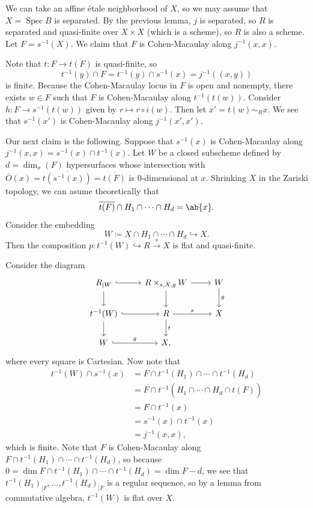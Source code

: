 \documentclass{amsart}
\theoremstyle{definition}
\theoremstyle{remark}
\theoremstyle{plain}
\theoremstyle{definition}
\theoremstyle{remark}
\newcommand{\ol}[1]{\overline{#1}}
\newcommand{\1}{\mathbf{1}}
\newcommand{\2}{\mathbf{2}}
\newcommand{\3}{\mathbf{3}}
\DeclareMathOperator{\Spec}{Spec}
\begin{document}
        We can take an affine \'etale neighborhood of \(X\), so we may assume that \(X = \Spec B\) is separated. By the previous lemma, \(j\) is separated, so \(R\) is separated and quasi-finite over \(X \times X\) (which is a scheme), so \(R\) is also a scheme. Let \(F = s^{-1}(X)\). We claim that \(F\) is Cohen-Macaulay along \(j^{-1}(x,x)\).

        Note that \(t \colon F \to \ol{t(F)}\) is quasi-finite, so 
        \[t^{-1}(y) \cap F = t^{-1}(y) \cap s^{-1}(x) = j^{-1}((x,y))\]
        is finite. Because the Cohen-Macaulay locus in \(F\) is open and nonempty, there exists \(w \in F\) such that \(F\) is Cohen-Macaulay along \(t^{-1}(t(w))\). Consider \(h \colon F \to s^{-1}(t(w))\) given by \(r \mapsto r \circ i(w)\). Then let \(x' = t(w) \sim_R x\). We see that \(s^{-1}(x')\) is Cohen-Macaulay along \(j^{-1}(x', x')\).
        
        Our next claim is the following. Suppose that \(s^{-1}(x)\) is Cohen-Macaulay along \(j^{-1}(x,x) = s^{-1}(x) \cap t^{-1}(x)\). Let \(W\) be a closed subscheme defined by \(d = \dim_x(F)\) hypersurfaces whose intersection with \(\ol{O}(x) = \ol{t(s^{-1}(x))} = \ol{t(F)}\) is \(0\)-dimensional at \(x\). Shrinking \(X\) in the Zariski topology, we can asume theoretically that
        \[ \ol{t(F)} \cap H_1 \cap \cdots \cap H_d = \ab\{x\}. \]
        Consider the embedding
        \[ W \coloneqq X \cap H_1 \cap \cdots \cap H_d \hookrightarrow X. \]
        Then the composition \(p \colon t^{-1}(W) \hookrightarrow R \xrightarrow{s} X\) is flat and quasi-finite.

        Consider the diagram
        \begin{equation*}
        \begin{tikzcd}
            R_{|W} \ar[hookrightarrow]{r} \ar{d} & R \times_{s,X,g} W \ar{d} \ar{r} & W \ar{d}{g} \\
            t^{-1}(W) \ar[hookrightarrow]{r} \ar{d} & R \ar{r}{s} \ar{d}{t} & X \\
            W \ar[hookrightarrow]{r}{g} & X,
        \end{tikzcd}
        \end{equation*}
        where every square is Cartesian. Now note that
        \begin{align*}
            t^{-1}(W) \cap s^{-1}(x) &= F \cap t^{-1}(H_1) \cap \cdots \cap t^{-1}(H_d) \\
            &= F \cap t^{-1}(H_1 \cap \cdots \cap H_d \cap \ol{t(F)}) \\
            &= F \cap t^{-1}(x) \\
            &= s^{-1}(x) \cap t^{-1}(x) \\
            &= j^{-1}(x,x),
        \end{align*}
        which is finite. Note that \(F\) is Cohen-Macaulay along \(F \cap t^{-1}(H_1) \cap \cdots \cap t^{-1}(H_d)\), so because \(0 = \dim F \cap t^{-1}(H_1) \cap \cdots \cap t^{-1}(H_d) = \dim F - d\), we see that \(t^{-1}(H_1)_{|F}, \ldots, t^{-1}(H_d)_{|F}\) is a regular sequence, so by a lemma from commutative algebra, \(t^{-1}(W)\) is flat over \(X\).
\end{document}
